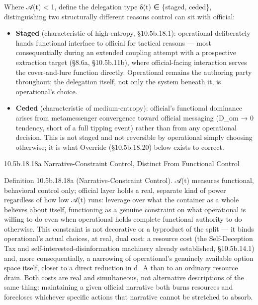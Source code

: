 \documentclass[
]{article}
\begin{document}
Where 𝒜(t) \textless{} 1, define the delegation type δ(t) ∈ \{staged,
ceded\}, distinguishing two structurally different reasons control can
sit with official:

\begin{itemize}
\item
  \textbf{Staged} (characteristic of high-entropy, §10.5b.18.1):
  operational deliberately hands functional interface to official for
  tactical reasons --- most consequentially during an extended coupling
  attempt with a prospective extraction target (§8.6a, §10.5b.11b),
  where official-facing interaction serves the cover-and-lure function
  directly. Operational remains the authoring party throughout; the
  delegation itself, not only the system beneath it, is operational's
  choice.
\item
  \textbf{Ceded} (characteristic of medium-entropy): official's
  functional dominance arises from metamessenger convergence toward
  official messaging (D\_om → 0 tendency, short of a full tipping event)
  rather than from any operational decision. This is not staged and not
  reversible by operational simply choosing otherwise; it is what
  Override (§10.5b.18.20) below exists to correct.
\end{itemize}

10.5b.18.18a Narrative-Constraint Control, Distinct From Functional
Control

Definition 10.5b.18.18a (Narrative-Constraint Control). 𝒜(t) measures
functional, behavioral control only; official layer holds a real,
separate kind of power regardless of how low 𝒜(t) runs: leverage over
what the container as a whole believes about itself, functioning as a
genuine constraint on what operational is willing to do even when
operational holds complete functional authority to do otherwise. This
constraint is not decorative or a byproduct of the split --- it binds
operational's actual choices, at real, dual cost: a resource cost (the
Self-Deception Tax and self-interested-disinformation machinery already
established, §10.5b.14.1) and, more consequentially, a narrowing of
operational's genuinely available option space itself, closer to a
direct reduction in d\_A than to an ordinary resource drain. Both costs
are real and simultaneous, not alternative descriptions of the same
thing: maintaining a given official narrative both burns resources and
forecloses whichever specific actions that narrative cannot be stretched
to absorb.
\end{document}
